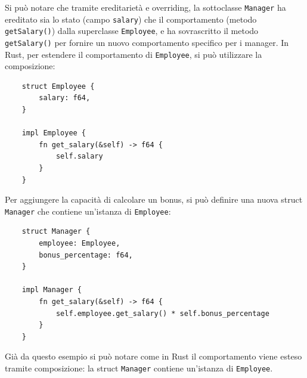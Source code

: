 Si può notare che tramite ereditarietà e overriding, la sottoclasse \texttt{Manager} ha ereditato sia lo stato (campo \texttt{salary}) che il comportamento (metodo \texttt{getSalary()}) dalla superclasse \texttt{Employee}, e ha sovrascritto il metodo \texttt{getSalary()} per fornire un nuovo comportamento specifico per i manager. In Rust, per estendere il comportamento di \texttt{Employee}, si può utilizzare la composizione:
\begin{verbatim}
    struct Employee {
        salary: f64,
    }

    impl Employee {
        fn get_salary(&self) -> f64 {
            self.salary
        }
    }
\end{verbatim}
Per aggiungere la capacità di calcolare un bonus, si può definire una nuova struct \texttt{Manager} che contiene un'istanza di \texttt{Employee}:
\begin{verbatim}
    struct Manager {
        employee: Employee,
        bonus_percentage: f64,
    }

    impl Manager {
        fn get_salary(&self) -> f64 {
            self.employee.get_salary() * self.bonus_percentage
        }
    }
\end{verbatim}
Già da questo esempio si può notare come in Rust il comportamento viene esteso tramite composizione: la struct \texttt{Manager} contiene un'istanza di \texttt{Employee}. 

